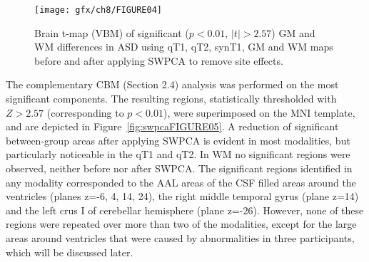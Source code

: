 \begin{figure}
	\centering
	\texttt{[image: gfx/ch8/FIGURE04]}
	\caption[Brain t-map (\acs{VBM}) of significant ($p<0.01$, $|t|>2.57$) \acs{GM} and \acs{WM} differences in \acs{ASD} using \acs{qT1}, \acs{qT2}, \acs{synT1}, \acs{GM} and \acs{WM} maps before and after applying \acs{SWPCA} to remove site effects.]{Brain t-map (\ac{VBM}) of significant ($p<0.01$, $|t|>2.57$) \ac{GM} and \ac{WM} differences in \ac{ASD} using \ac{qT1}, \ac{qT2}, \ac{synT1}, \ac{GM} and \ac{WM} maps before and after applying \ac{SWPCA} to remove site effects.}
	\label{fig:swpcaFIGURE04}
\end{figure}

The complementary CBM (Section 2.4) analysis was performed on the most
significant components. The resulting regions, statistically
thresholded with $Z>2.57$ (corresponding to $p<0.01$), were superimposed on the
\ac{MNI} template, and are depicted in Figure~\ref{fig:swpcaFIGURE05}. A reduction of significant
between-group areas after applying SWPCA is evident in most modalities,
but particularly noticeable in the \ac{qT1} and \ac{qT2}. In \ac{WM} no significant
regions were observed, neither before nor after SWPCA. The significant
regions identified in any modality corresponded to the AAL areas of the
CSF filled areas around the ventricles (planes z=-6, 4, 14, 24), the
right middle temporal gyrus (plane z=14) and the left crus I of
cerebellar hemisphere (plane z=-26). However, none of these regions
were repeated over more than two of the modalities, except for the
large areas around ventricles that were caused by abnormalities in
three participants, which will be discussed later.

